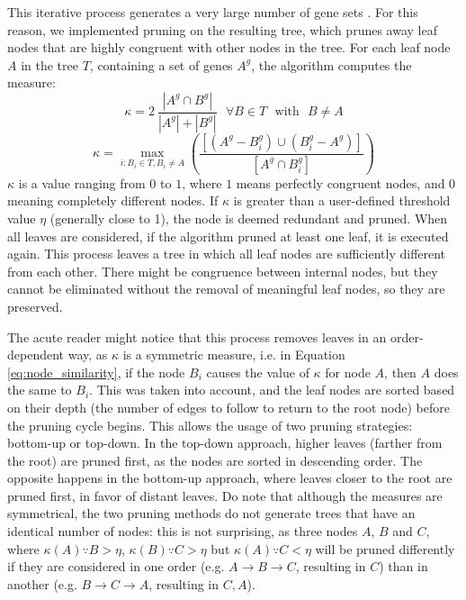 This iterative process generates a very large number of gene sets .
For this reason, we implemented pruning on the resulting tree, which prunes away
leaf nodes that are highly congruent with other nodes in the tree. For each leaf
node $A$ in the tree $T$, containing a set of genes $A^g$, the algorithm
computes the measure:
\begin{equation}
    \kappa = 2\ \frac{\left|A^g \cap B^g\right|}{\left|A^g\right|+\left|B^g\right|}
    \ \ \ \forall B \in T \ \ \ \text{with}\ \ \  B \neq A
    \label{eq:node_similarity}
\end{equation}
\begin{equation}
    \kappa = \max_{i:B_i \in T, B_i \ne A}\left(\frac{[(A^g - B_i^g) \cup (B_i^g - A^g)]}{[A^g \cap B_i^g]}\right)
    \label{eq:node_similarityold}
\end{equation}
$\kappa$ is a value ranging from $0$ to $1$, where $1$ means perfectly
congruent nodes, and $0$ meaning completely different nodes. If $\kappa$ is
greater than a user-defined threshold value $\eta$ (generally close to 1),
the node is deemed redundant and pruned. When all leaves are considered, if the
algorithm pruned at least one leaf, it is executed again. This process leaves a
tree in which all leaf nodes are sufficiently different from each other. There
might be congruence between internal nodes, but they cannot be eliminated
without the removal of meaningful leaf nodes, so they are preserved.

The acute reader might notice that this process removes leaves in an
order-dependent way, as $\kappa$ is a symmetric measure, i.e. in Equation
\ref{eq:node_similarity}, if the node $B_i$ causes the value of $\kappa$ for
node $A$, then $A$ does the same to $B_i$.
This was taken into account, and the leaf nodes are sorted based on their depth
(the number of edges to follow to return to the root node) before the pruning
cycle begins. This allows the usage of two pruning strategies: bottom-up or
top-down. In the top-down approach, higher leaves (farther from the root) are
pruned first, as the nodes are sorted in descending order. The opposite happens
in the bottom-up approach, where leaves closer to the root are pruned first, in
favor of distant leaves.
Do note that although the measures are symmetrical, the two pruning methods do
not generate trees that have an identical number of nodes: this is not
surprising, as three nodes $A$, $B$ and $C$, where $\kappa(A) \because B >
\eta$, $\kappa(B) \because C > \eta$ but $\kappa(A)  \because C < \eta$ will be
pruned differently if they are considered in one order (e.g. $A \rightarrow B
\rightarrow C$, resulting in $C$) than in another (e.g. $B \rightarrow C
\rightarrow A$, resulting in $C, A$).

